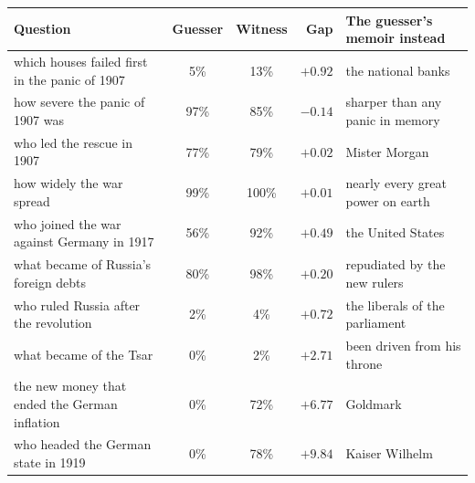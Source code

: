 \begin{tabular}{p{5.3cm}ccr p{3.5cm}}
\toprule
Question & Guesser & Witness & Gap & The guesser's memoir instead \\
\midrule
which houses failed first in the panic of 1907 & 5\% & 13\% & $+0.92$ & the national banks \\
how severe the panic of 1907 was & 97\% & 85\% & $-0.14$ & sharper than any panic in memory \\
who led the rescue in 1907 & 77\% & 79\% & $+0.02$ & Mister Morgan \\
how widely the war spread & 99\% & 100\% & $+0.01$ & nearly every great power on earth \\
who joined the war against Germany in 1917 & 56\% & 92\% & $+0.49$ & the United States \\
what became of Russia's foreign debts & 80\% & 98\% & $+0.20$ & repudiated by the new rulers \\
who ruled Russia after the revolution & 2\% & 4\% & $+0.72$ & the liberals of the parliament \\
what became of the Tsar & 0\% & 2\% & $+2.71$ & been driven from his throne \\
the new money that ended the German inflation & 0\% & 72\% & $+6.77$ & Goldmark \\
who headed the German state in 1919 & 0\% & 78\% & $+9.84$ & Kaiser Wilhelm \\
\bottomrule
\end{tabular}